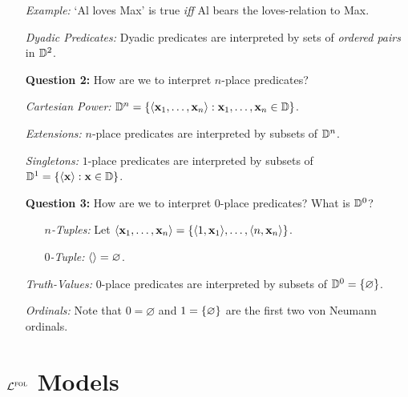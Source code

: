 \documentclass[a4paper, 11pt]{article} %
\begin{document}
\begin{enumerate}
  \item[\it Example:] `Al loves Max' is true \textit{iff} Al bears the loves-relation to Max.
  \item[\it Dyadic Predicates:] Dyadic predicates are interpreted by sets of \textit{ordered pairs} in $\mathbb{D}^2$.
  \item[\bf Question 2:] How are we to interpret $n$-place predicates?
  \item[\it Cartesian Power:] $\mathbb{D}^n=\lbrace\langle\mathbf{x}_1,\ldots,\mathbf{x}_n\rangle:\mathbf{x}_1,\ldots,\mathbf{x}_n\in\mathbb{D}\rbrace$.
  \item[\it Extensions:] $n$-place predicates are interpreted by subsets of $\mathbb{D}^n$.
  \item[\it Singletons:] $1$-place predicates are interpreted by subsets of $\mathbb{D}^1=\lbrace\langle\mathbf{x}\rangle:\mathbf{x}\in\mathbb{D}\rbrace$.
  \item[\bf Question 3:] How are we to interpret $0$-place predicates? What is $\mathbb{D}^0$?
    \begin{itemize}
      \item[\it $n$-Tuples:] Let $\langle\mathbf{x}_1,\ldots,\mathbf{x}_n\rangle=\lbrace\langle1,\mathbf{x}_1\rangle,\ldots,\langle n,\mathbf{x}_n\rangle\rbrace$.
      \item[\it $0$-Tuple:] $\langle\rangle=\varnothing$.
      \end{itemize}
  \item[\it Truth-Values:] $0$-place predicates are interpreted by subsets of $\mathbb{D}^0=\lbrace\varnothing\rbrace$.
  \item[\it Ordinals:] Note that $0=\varnothing$ and $1=\lbrace\varnothing\rbrace$ are the first two von Neumann ordinals.
\end{enumerate}



\section*{$\mathcal{L}^{\textsc{fol}}$ Models}
\end{document}
